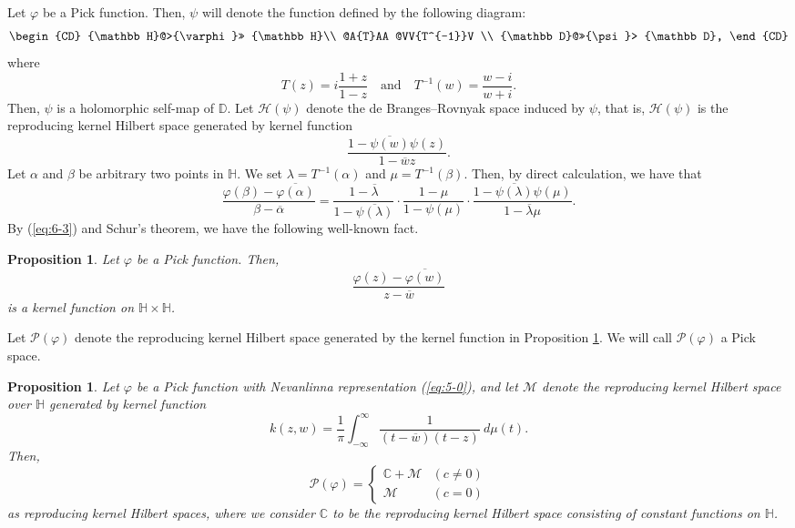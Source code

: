 \documentclass[12pt]{article}
\newtheorem{prop}[thm]{Proposition}
\numberwithin{equation}{section}
\newcommand{\M}{{\mathcal M}}
\newcommand{\cP}{{\mathcal P}}
\newcommand{\C}{{\mathbb C}}
\newcommand{\D}{{\mathbb D}}
\newcommand{\bH}{{\mathbb H}}
\newcommand{\cH}{{\mathcal H}}
\newcommand{\lam}{\lambda}
\begin{document}
Let $\varphi$ be a Pick function. 
Then, $\psi$ will denote the function defined by the following diagram:
\begin{equation}\label{eq:6-2}
\begin{CD}
\bH @>{\varphi}>> \bH \\
@A{T}AA    @VV{T^{-1}}V \\
\D  @>>{\psi}>  \D,
\end{CD}
\end{equation}
where 
\[
T(z)=i\dfrac{1+z}{1-z}\quad \text{and}\quad T^{-1}(w)=\frac{w-i}{w+i}.
\]
Then, $\psi$ is a holomorphic self-map of $\D$. 
Let $\cH(\psi)$ denote the de Branges--Rovnyak space induced by $\psi$, that is, 
$\cH(\psi)$ is the reproducing kernel Hilbert space generated by kernel function
\[
\frac{1-\overline{\psi(w)}\psi(z)}{1-\overline{w}z}.
\] 
Let $\alpha$ and $\beta$ be arbitrary two points in $\bH$. 
We set $\lam=T^{-1}(\alpha)$ and $\mu=T^{-1}(\beta)$. 
Then, by direct calculation, we have that 
\begin{equation}\label{eq:6-3}
\frac{\varphi(\beta)-\overline{\varphi(\alpha)}}{\beta-\overline{\alpha}}
=\frac{1-\overline{\lam}}{1-\overline{\psi(\lam)}} \cdot \frac{1-\mu}{1-\psi(\mu)} \cdot \frac{1-\overline{\psi(\lam)}\psi(\mu)}{1-\overline{\lam}\mu}.
\end{equation}
By (\ref{eq:6-3}) and Schur's theorem,
we have the following well-known fact. 
\begin{prop}\label{prop:5-2}
Let $\varphi$ be a Pick function. Then, 
\[
\frac{\varphi (z)-\overline{\varphi (w)}}{z-\overline{w}}
\]
is a kernel function on $\bH \times \bH$.
\end{prop}

Let $\cP(\varphi)$ denote
the reproducing kernel Hilbert space generated by the kernel function in Proposition \ref{prop:5-2}. 
We will call $\cP(\varphi)$ a Pick space.

\begin{prop}\label{thm:5-4}
Let $\varphi$ be a Pick function
with Nevanlinna representation (\ref{eq:5-0}), 
and let $\M$ denote the reproducing kernel Hilbert space over $\bH$ generated by kernel function 
\[
k(z,w)=\frac{1}{\pi}\int_{-\infty}^{\infty}\frac{1}{(t-\overline{w})(t-z)}\ d\mu(t).
\]
Then, 
\[
\cP(\varphi)=
\begin{cases}
\C + \M & (c \neq 0)\\
\M & (c=0 )
\end{cases}
\] 
as reproducing kernel Hilbert spaces,  
where we consider $\C$ to be the reproducing kernel Hilbert space consisting of constant functions on $\bH$. 
\end{prop}
\end{document}
